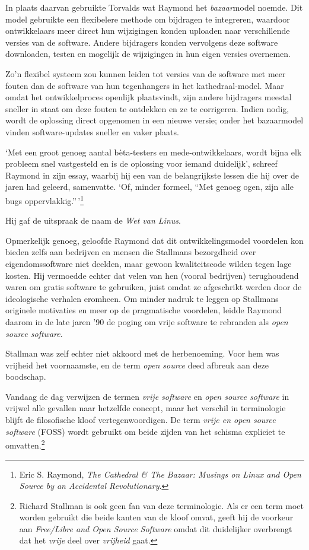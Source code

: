\documentclass[
  a5paper,
  smalldemyvopaper,11pt,twoside,onecolumn,openright,extrafontsizes,
hidelinks]{memoir}
\begin{document}
In plaats daarvan gebruikte Torvalds wat Raymond het \emph{bazaar}model
noemde. Dit model gebruikte een flexibelere methode om bijdragen te
integreren, waardoor ontwikkelaars meer direct hun wijzigingen konden
uploaden naar verschillende versies van de software. Andere bijdragers
konden vervolgens deze software downloaden, testen en mogelijk de
wijzigingen in hun eigen versies overnemen.

Zo'n flexibel systeem zou kunnen leiden tot versies van de software met
meer fouten dan de software van hun tegenhangers in het
kathedraal-model. Maar omdat het ontwikkelproces openlijk plaatsvindt,
zijn andere bijdragers meestal sneller in staat om deze fouten te
ontdekken en ze te corrigeren. Indien nodig, wordt de oplossing direct
opgenomen in een nieuwe versie; onder het bazaarmodel vinden
software-updates sneller en vaker plaats.

`Met een groot genoeg aantal bèta-testers en mede-ontwikkelaars, wordt
bijna elk probleem snel vastgesteld en is de oplossing voor iemand
duidelijk', schreef Raymond in zijn essay, waarbij hij een van de
belangrijkste lessen die hij over de jaren had geleerd, samenvatte. `Of,
minder formeel, ``Met genoeg ogen, zijn alle bugs
oppervlakkig.''\,'\footnote{\hspace{0pt}Eric S. Raymond, \emph{The
  Cathedral \& The Bazaar: Musings on Linux and Open Source by an
  Accidental Revolutionary}.}

Hij gaf de uitspraak de naam de \emph{Wet van Linus}.

Opmerkelijk genoeg, geloofde Raymond dat dit ontwikkelingsmodel
voordelen kon bieden zelfs aan bedrijven en mensen die Stallmans
bezorgdheid over eigendomssoftware niet deelden, maar gewoon
kwaliteitscode wilden tegen lage kosten. Hij vermoedde echter dat velen
van hen (vooral bedrijven) terughoudend waren om gratis software te
gebruiken, juist omdat ze afgeschrikt werden door de ideologische
verhalen eromheen. Om minder nadruk te leggen op Stallmans originele
motivaties en meer op de pragmatische voordelen, leidde Raymond daarom
in de late jaren '90 de poging om vrije software te rebranden als
\emph{open source software}.

Stallman was zelf echter niet akkoord met de herbenoeming. Voor hem was
vrijheid het voornaamste, en de term \emph{open source} deed afbreuk aan
deze boodschap.

Vandaag de dag verwijzen de termen \emph{vrije software} en \emph{open
source software} in vrijwel alle gevallen naar hetzelfde concept, maar
het verschil in terminologie blijft de filosofische kloof
vertegenwoordigen. De term \emph{vrije en open source software} (FOSS)
wordt gebruikt om beide zijden van het schisma expliciet te
omvatten.\footnote{Richard Stallman is ook geen fan van deze
  terminologie. Als er een term moet worden gebruikt die beide kanten
  van de kloof omvat, geeft hij de voorkeur aan \emph{Free/Libre and
  Open Source Software} omdat dit duidelijker overbrengt dat het
  \emph{vrije} deel over \emph{vrijheid} gaat.}
\end{document}
